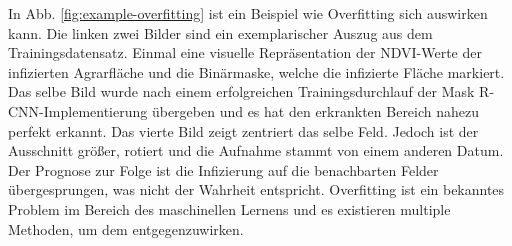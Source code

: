 \noindent
{}
In Abb. \ref{fig:example-overfitting} ist ein Beispiel wie Overfitting sich auswirken kann. Die linken zwei Bilder sind ein exemplarischer Auszug aus dem Trainingsdatensatz. Einmal eine visuelle Repräsentation der NDVI-Werte der infizierten Agrarfläche und die Binärmaske, welche die infizierte Fläche markiert. Das selbe Bild wurde nach einem erfolgreichen Trainingsdurchlauf der Mask R-CNN-Implementierung übergeben und es hat den erkrankten Bereich nahezu perfekt erkannt. Das vierte Bild zeigt zentriert das selbe Feld. Jedoch ist der Ausschnitt größer, rotiert und die Aufnahme stammt von einem anderen Datum. Der Prognose zur Folge ist die Infizierung auf die benachbarten Felder übergesprungen, was nicht der Wahrheit entspricht. Overfitting ist ein bekanntes Problem im Bereich des maschinellen Lernens und es existieren multiple Methoden, um dem entgegenzuwirken.